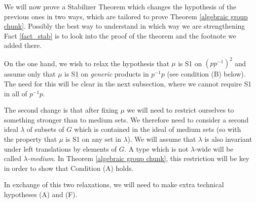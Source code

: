 \documentclass[12pt]{article}
\theoremstyle{definition}
\theoremstyle{mystyle}
\theoremstyle{remark}
\begin{document}
We will now prove a Stabilizer Theorem which changes the
hypothesis of the previous ones in two ways, which are tailored to
prove Theorem \ref{algebraic group chunk}. Possibly the best way
to understand in which way we are strengthening Fact
\ref{fact_stab} is to look into the proof of the theorem and the
footnote we added there.

On the one hand, we wish to relax the hypothesis that $\mu$ is S1
on $(pp^{-1})^2$ and assume only that $\mu$ is S1 on
\emph{generic} products in $p^{-1}p$ (see condition (B) below).
The need for this will be clear in the next subsection, where we
cannot require S1 in all of $p^{-1}p$.

The second change is that after fixing $\mu$ we will need to
restrict ourselves to something stronger than to medium sets. We
therefore need to consider a second ideal $\lambda$ of subsets of
$G$ which is contained in the ideal of medium sets (so with the
property that $\mu$ is S1 on any set in $\lambda$). We will assume
that $\lambda$ is also invariant under left translations by
elements of $G$. A type which is not $\lambda$-wide will be called
\emph{$\lambda$-medium}. In Theorem \ref{algebraic group chunk},
this restriction will be key in order to show that Condition (A)
holds.

In exchange of this two relaxations, we will need to make extra
technical hypotheses (A) and (F).
\end{document}
